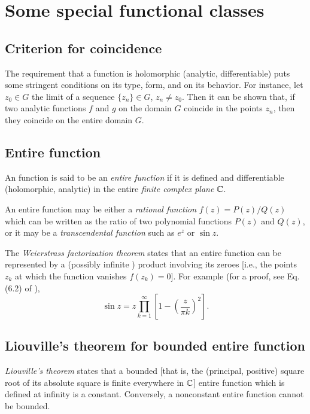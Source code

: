 \section{Some special functional classes}

\subsection{Criterion for coincidence}

The requirement that a function is holomorphic (analytic, differentiable)
puts some stringent conditions on its type, form, and on its behavior.
For instance,
let
$z_0\in G$ the limit of a sequence
$\{z_n\}\in G$, $z_n\ne z_0$.
Then it can be shown that,
if two analytic functions
$f$ and $g$
on the domain $G$  coincide in the points $z_n$,
then they coincide on the entire domain $G$.

\subsection{Entire function}

An function is said to be an {\em entire function}
if it is defined and differentiable (holomorphic, analytic)
in the entire {\em finite complex plane} ${\Bbb C}$.

An entire function may be
either a
{\em rational function}
$f(z)=P(z)/Q(z)$
which can be written as the ratio of two polynomial functions
$P(z)$ and $Q(z)$,
or it may be a
{\em transcendental function}
such as $e^z$ or $\sin z$.


The
{\em  Weierstrass factorization theorem}
states that an entire function can be represented by a
(possibly infinite \cite{Gamelin-ca})
product involving its zeroes [i.e., the points $z_k$
at which the function vanishes $f(z_k)=0$].
For example (for a proof, see Eq. (6.2) of
\cite{conway-focvI}),
\begin{equation}
\sin z = z \prod_{k=1}^\infty \left[ 1-  \left(\frac{z}{\pi k}\right)^2\right].
\end{equation}


\subsection{Liouville's theorem for bounded entire function}
\label{2012-m-ch-ca-lt}
{\em Liouville's theorem}
states that
a bounded [that is, the (principal, positive)
square root of its absolute square is finite everywhere in ${\Bbb C}$]
entire function which is defined at infinity
is a constant.
Conversely, a nonconstant entire function cannot be bounded.


